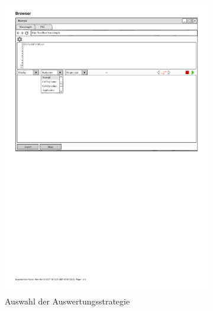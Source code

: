 \documentclass[parskip=full,11pt,twoside]{scrartcl}
\begin{document}
\begin{figure}[H]
\begin{subfigure}[m]{0.25\textwidth}
		\includegraphics{img/reductionMenu}
	\caption{Auswahl der Auswertungsstrategie}
	\end{subfigure}
	\hspace*{\fill}
	\begin{subfigure}[r]{0.25\textwidth}
	\centering

\end{subfigure}
\end{figure}
\end{document}
